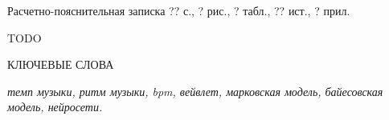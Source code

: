 
Расчетно-пояснительная записка ?? с., ? рис., ? табл., ?? ист., ? прил.

TODO

КЛЮЧЕВЫЕ СЛОВА

\textit{темп музыки, ритм музыки, bpm, вейвлет, марковская модель, байесовская модель, нейросети.}

\clearpage